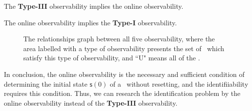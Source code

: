 \begin{lemma}
The {\bf Type-III} observability implies the online observability.
\label{lemm:4}
\end{lemma}

\begin{lemma}
The online observability implies the  {\bf Type-I} observability.
\label{lemm:3}
\end{lemma}






\begin{figure}[thpb]
      \centering
     \caption{The relationships graph between all five observability, where the area labelled with a type of observability presents the set of \BCNs\ which satisfy this type of observability, and  ``U" means all of the \BCNs.}
      \label{fig:7}
   \end{figure}

In conclusion, the online observability is the necessary and sufficient condition of determining the initial state $\mathsf{s}(0)$ of a \BCN\  without  resetting, %
and the identifiiability requires this condition. Thus, we can research the identification problem by the online observability instead of the {\bf Type-III} observability. 





